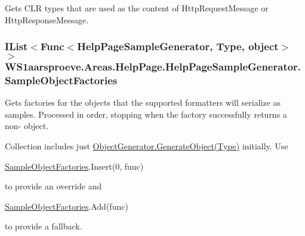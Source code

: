 Gets C\+L\+R types that are used as the content of Http\+Request\+Message or Http\+Response\+Message. 

\hypertarget{class_w_s1aarsproeve_1_1_areas_1_1_help_page_1_1_help_page_sample_generator_aca3950f9dbe43316aa63aeaaeb1b05b1}{}
\subsubsection[{Sample\+Object\+Factories}]{\setlength{\rightskip}{0pt plus 5cm}I\+List$<$Func$<${\bf Help\+Page\+Sample\+Generator}, Type, object$>$ $>$ W\+S1aarsproeve.\+Areas.\+Help\+Page.\+Help\+Page\+Sample\+Generator.\+Sample\+Object\+Factories\hspace{0.3cm}{\ttfamily [get]}}\label{class_w_s1aarsproeve_1_1_areas_1_1_help_page_1_1_help_page_sample_generator_aca3950f9dbe43316aa63aeaaeb1b05b1}


Gets factories for the objects that the supported formatters will serialize as samples. Processed in order, stopping when the factory successfully returns a non-\/ object. 

Collection includes just \hyperlink{class_w_s1aarsproeve_1_1_areas_1_1_help_page_1_1_object_generator_ac9ee0b5d7e70f42b70a0785d17b661a7}{Object\+Generator.\+Generate\+Object(\+Type)} initially. Use 
\begin{DoxyCode}
\hyperlink{class_w_s1aarsproeve_1_1_areas_1_1_help_page_1_1_help_page_sample_generator_aca3950f9dbe43316aa63aeaaeb1b05b1}{SampleObjectFactories}.Insert(0, func)
\end{DoxyCode}
 to provide an override and 
\begin{DoxyCode}
\hyperlink{class_w_s1aarsproeve_1_1_areas_1_1_help_page_1_1_help_page_sample_generator_aca3950f9dbe43316aa63aeaaeb1b05b1}{SampleObjectFactories}.Add(func)
\end{DoxyCode}
 to provide a fallback.\hypertarget{class_w_s1aarsproeve_1_1_areas_1_1_help_page_1_1_help_page_sample_generator_a64ab17da769ced26a1908d1e48d5f9d0}{}
